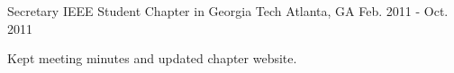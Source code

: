 \begin{cventries}
  \cventry
    {Secretary} %
    {IEEE Student Chapter in Georgia Tech} %
    {Atlanta, GA} %
    {Feb. 2011 - Oct. 2011} %
    {
      \begin{cvitems} %
        \item {Kept meeting minutes and updated chapter website.}
      \end{cvitems}
    }

\end{cventries}
